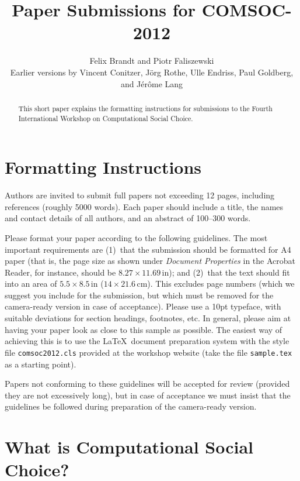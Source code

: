 \documentclass{comsoc2012}
\title{Paper Submissions for COMSOC-2012}
\author{Felix Brandt and Piotr Faliszewski\\
\footnotesize{Earlier versions by Vincent Conitzer, J\"org Rothe, Ulle Endriss, Paul Goldberg, and J\'er\^ome Lang}}
\begin{document}

\begin{abstract}
  This short paper explains the formatting instructions for
  submissions to the Fourth International Workshop on Computational
  Social Choice.
\end{abstract}


\section{Formatting Instructions}

Authors are invited to submit full papers not exceeding 12 pages, 
including references (roughly 5000 words). Each paper should include 
a title, the names and contact details of all authors, and an abstract 
of 100--300 words.

Please format your paper according to the following guidelines.
The most important requirements are (1)~that the submission should be 
formatted for A4 paper (that is, the page size as shown under 
\emph{Document Properties} in the Acrobat Reader, for instance, should 
be $8.27\times 11.69\,\mbox{in}$); and (2)~that the text should fit into 
an area of $5.5\times 8.5\,\mbox{in}$ ($14\times 21.6\,\mbox{cm}$). 
This excludes page numbers (which we suggest you include for the 
submission, but which must be removed for the camera-ready version in 
case of acceptance). Please use a 10pt typeface, with suitable deviations
for section headings, footnotes, etc. In general, please aim at having 
your paper look as close to this sample as possible. The easiest way of 
achieving this is to use the \LaTeX\ document preparation system with the 
style file \texttt{comsoc2012.cls} provided at the workshop  website 
(take the file \texttt{sample.tex} as a starting point).

Papers not conforming to these guidelines will be accepted for review
(provided they are not excessively long), but in case of acceptance we
must insist that the guidelines be followed during preparation of the 
camera-ready version.  


\section{What is Computational Social Choice?}
\end{document}
